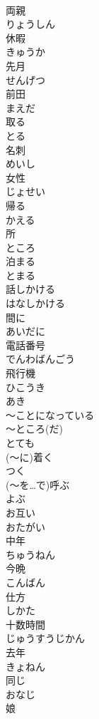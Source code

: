\documentclass[8pt]{extreport}
\begin{document}
\begin{CJK}{UTF8}{min}
\\	両親	
\\	りょうしん
\\	休暇	
\\	きゅうか
\\	先月	
\\	せんげつ
\\	前田	
\\	まえだ
\\	取る	
\\	とる
\\	名刺	
\\	めいし
\\	女性	
\\	じょせい
\\	帰る	
\\	かえる
\\	所	
\\	ところ
\\	泊まる	
\\	とまる
\\	話しかける	
\\	はなしかける
\\	間に	
\\	あいだに
\\	電話番号	
\\	でんわばんごう
\\	飛行機	
\\	ひこうき
\\	あき	
\\	～ことになっている	
\\	～ところ(だ)	
\\	とても	
\\	(～に)着く	
\\	つく
\\	(～を…で)呼ぶ	
\\	よぶ
\\	お互い	
\\	おたがい
\\	中年	
\\	ちゅうねん
\\	今晩	
\\	こんばん
\\	仕方	
\\	しかた
\\	十数時間	
\\	じゅうすうじかん
\\	去年	
\\	きょねん
\\	同じ	
\\	おなじ
\\	娘	

\end{CJK}
\end{document}
